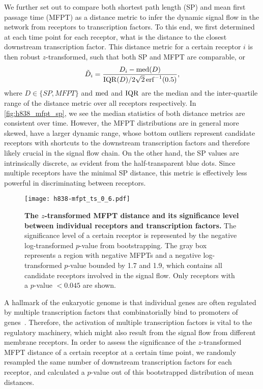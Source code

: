 We further set out to compare both shortest path length (SP) and mean first 
passage time (MFPT) as a distance metric to infer the dynamic signal flow
in the network from receptors to transcription factors. To this end, we
first determined at each time point for each receptor, what is
the distance to the closest downstream transcription 
factor. This distance metric for a certain receptor
$i$ is then robust $z$-transformed, such that both SP and MFPT 
are comparable, or
\[
\tilde{D}_{i} = \frac{D_{i}-\operatorname{med}(D)}{\operatorname{IQR}(D)/2\sqrt{2}\operatorname{erf}^{-1}(0.5)}, 
\]
where $D \in \{SP,MFPT\}$ and $\operatorname{med}$ and $\operatorname{IQR}$ are the median 
and 
the inter-quartile range of the distance metric over all 
receptors 
respectively. In \ref{fig:h838_mfpt_sp}, we see the median
statistics of both distance metrics are consistent over time. However, the 
MFPT distributions are in general more skewed, have a larger dynamic range,
whose bottom outliers represent candidate receptors with shortcuts to the
downstream transcription factors and therefore likely crucial in the signal
flow chain. On the other hand, the SP values are intrinsically discrete, as
evident from the half-transparent blue dots. Since multiple receptors have
the minimal SP distance, this metric is effectively less powerful in
discriminating between receptors.

\begin{figure}[!ht]
\begin{center}
\texttt{[image: h838-mfpt\_ts\_0\_6.pdf]}
\end{center}
\caption[Shortcut between receptors and TFs over time]{
{\bf The $z$-transformed MFPT distance and its significance
level between individual receptors
and transcription factors.} 
The significance level of a certain receptor is represented
by the negative log-transformed $p$-value from bootstrapping.
The gray box represents a region
with negative MFPTs and a negative log-transformed $p$-value
bounded by 1.7 and 1.9, which contains all candidate
receptors involved in the signal flow.
Only receptors with a $p$-value $<0.045$ are shown.
}
\label{fig:h838_mfpt_ts}
\end{figure}

A hallmark of the eukaryotic genome is that individual genes are often 
regulated by multiple transcription factors that combinatorially bind to 
promoters of genes~\citep{Harbison2004}. Therefore, the activation of multiple transcription
factors is vital to the regulatory machinery, which might also result
from the signal flow from different membrane receptors.
In order to assess the significance of the $z$-transformed 
MFPT distance of a certain receptor at a certain time point, 
we randomly resampled the same number of downstream
transcription factors for each receptor, and calculated a
$p$-value out of this bootstrapped distribution of mean 
distances.


